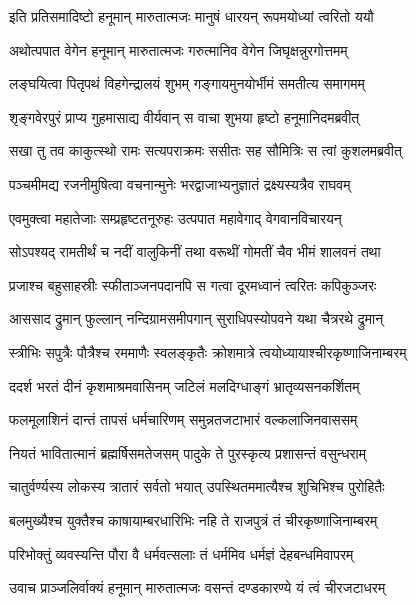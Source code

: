 \twolineshloka
{इति प्रतिसमादिष्टो हनूमान् मारुतात्मजः}
{मानुषं धारयन् रूपमयोध्यां त्वरितो ययौ} %

\twolineshloka
{अथोत्पपात वेगेन हनूमान् मारुतात्मजः}
{गरुत्मानिव वेगेन जिघृक्षन्नुरगोत्तमम्} %

\twolineshloka
{लङ्घयित्वा पितृपथं विहगेन्द्रालयं शुभम्}
{गङ्गायमुनयोर्भीमं समतीत्य समागमम्} %

\twolineshloka
{शृङ्गवेरपुरं प्राप्य गुहमासाद्य वीर्यवान्}
{स वाचा शुभया हृष्टो हनूमानिदमब्रवीत्} %

\twolineshloka
{सखा तु तव काकुत्स्थो रामः सत्यपराक्रमः}
{ससीतः सह सौमित्रिः स त्वां कुशलमब्रवीत्} %

\twolineshloka
{पञ्चमीमद्य रजनीमुषित्वा वचनान्मुनेः}
{भरद्वाजाभ्यनुज्ञातं द्रक्ष्यस्यत्रैव राघवम्} %

\twolineshloka
{एवमुक्त्वा महातेजाः सम्प्रहृष्टतनूरुहः}
{उत्पपात महावेगाद् वेगवानविचारयन्} %

\twolineshloka
{सोऽपश्यद् रामतीर्थं च नदीं वालुकिनीं तथा}
{वरूथीं गोमतीं चैव भीमं शालवनं तथा} %

\twolineshloka
{प्रजाश्च बहुसाहस्रीः स्फीताञ्जनपदानपि}
{स गत्वा दूरमध्वानं त्वरितः कपिकुञ्जरः} %

\twolineshloka
{आससाद द्रुमान् फुल्लान् नन्दिग्रामसमीपगान्}
{सुराधिपस्योपवने यथा चैत्ररथे द्रुमान्} %

\twolineshloka
{स्त्रीभिः सपुत्रैः पौत्रैश्च रममाणैः स्वलङ्कृतैः}
{क्रोशमात्रे त्वयोध्यायाश्चीरकृष्णाजिनाम्बरम्} %

\twolineshloka
{ददर्श भरतं दीनं कृशमाश्रमवासिनम्}
{जटिलं मलदिग्धाङ्गं भ्रातृव्यसनकर्शितम्} %

\twolineshloka
{फलमूलाशिनं दान्तं तापसं धर्मचारिणम्}
{समुन्नतजटाभारं वल्कलाजिनवाससम्} %

\twolineshloka
{नियतं भावितात्मानं ब्रह्मर्षिसमतेजसम्}
{पादुके ते पुरस्कृत्य प्रशासन्तं वसुन्धराम्} %

\twolineshloka
{चातुर्वर्ण्यस्य लोकस्य त्रातारं सर्वतो भयात्}
{उपस्थितममात्यैश्च शुचिभिश्च पुरोहितैः} %

\twolineshloka
{बलमुख्यैश्च युक्तैश्च काषायाम्बरधारिभिः}
{नहि ते राजपुत्रं तं चीरकृष्णाजिनाम्बरम्} %

\twolineshloka
{परिभोक्तुं व्यवस्यन्ति पौरा वै धर्मवत्सलाः}
{तं धर्ममिव धर्मज्ञं देहबन्धमिवापरम्} %

\twolineshloka
{उवाच प्राञ्जलिर्वाक्यं हनूमान् मारुतात्मजः}
{वसन्तं दण्डकारण्ये यं त्वं चीरजटाधरम्} %

